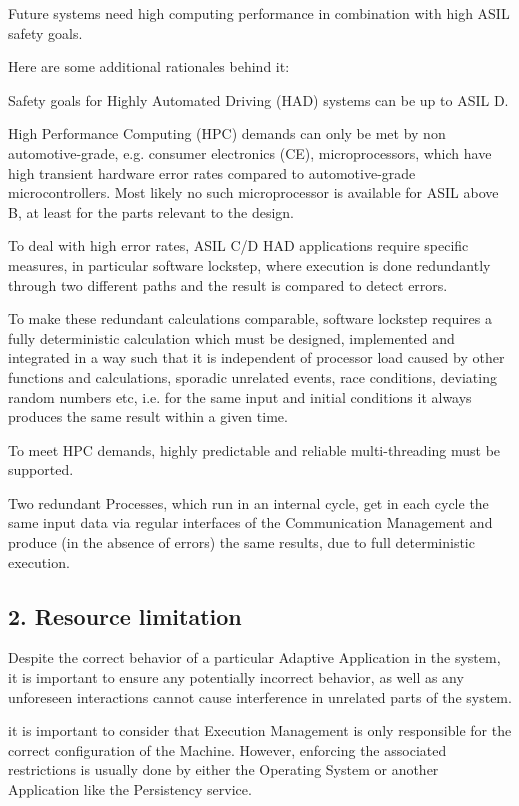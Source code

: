 \begin{DoxyItemize}
\item Future systems need high computing performance in combination with high A\+S\+IL safety goals.
\item Here are some additional rationales behind it\+:
\begin{DoxyItemize}
\item Safety goals for Highly Automated Driving (H\+AD) systems can be up to A\+S\+IL D.
\item High Performance Computing (H\+PC) demands can only be met by non automotive-\/grade, e.\+g. consumer electronics (CE), microprocessors, which have high transient hardware error rates compared to automotive-\/grade microcontrollers. Most likely no such microprocessor is available for A\+S\+IL above B, at least for the parts relevant to the design.
\item To deal with high error rates, A\+S\+IL C/D H\+AD applications require specific measures, in particular software lockstep, where execution is done redundantly through two different paths and the result is compared to detect errors.
\item To make these redundant calculations comparable, software lockstep requires a fully deterministic calculation which must be designed, implemented and integrated in a way such that it is independent of processor load caused by other functions and calculations, sporadic unrelated events, race conditions, deviating random numbers etc, i.\+e. for the same input and initial conditions it always produces the same result within a given time.
\item To meet H\+PC demands, highly predictable and reliable multi-\/threading must be supported.
\end{DoxyItemize}
\item Two redundant Processes, which run in an internal cycle, get in each cycle the same input data via regular interfaces of the Communication Management and produce (in the absence of errors) the same results, due to full deterministic execution.
\end{DoxyItemize}

\subsection*{2. {\bfseries Resource limitation}}


\begin{DoxyItemize}
\item Despite the correct behavior of a particular Adaptive Application in the system, it is important to ensure any potentially incorrect behavior, as well as any unforeseen interactions cannot cause interference in unrelated parts of the system.
\item it is important to consider that Execution Management is only responsible for the correct configuration of the Machine. However, enforcing the associated restrictions is usually done by either the Operating System or another Application like the Persistency service.
\end{DoxyItemize}

